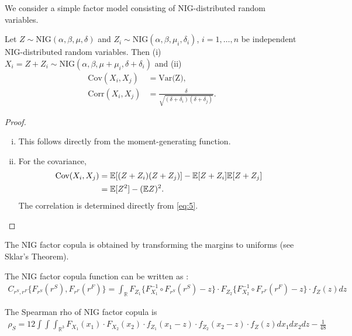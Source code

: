 We consider a simple factor model consisting of NIG-distributed random
variables.
\begin{proposition}
  \label{prop:NIG}
  Let $Z\sim \text{NIG}(\alpha, \beta, \mu, \delta)$ and
  $Z_i\sim \text{NIG}(\alpha, \beta, \mu_i, \delta_i)$,
  $i=1,\ldots, n$ be independent NIG-distributed random
  variables. Then (i) 
  $X_i = Z + Z_i\sim \text{NIG}(\alpha,\beta,\mu+\mu_i,
  \delta+\delta_i)$ and (ii)
  \begin{align}
    \text{Cov}(X_i,X_j) &= \text{Var(Z)},\nonumber\\
    \text{Corr}(X_i,X_j) &= \frac{\delta}{\sqrt{(\delta+\delta_i)
                           (\delta+\delta_j)}}. \label{eq:6}
  \end{align}
\end{proposition}
\begin{proof}
  \begin{enumerate}[(i)]
  \item This follows directly from the moment-generating function. 
  \item For the covariance,
    \begin{align*}
      \text{Cov}(X_i,X_j)
      &= {\mathbb{E}}[(Z+Z_i) (Z+Z_j)] - {\mathbb{E}}[Z+Z_i] {\mathbb{E}}[Z+Z_j]\\
      &= {\mathbb{E}}[Z^2] -({\mathbb{E}} Z)^2.
    \end{align*}
    The correlation is determined directly from \eqref{eq:5}. 
  \end{enumerate}
\end{proof}

The NIG factor copula is obtained by transforming the margins to
uniforms (see Sklar's Theorem).

The NIG factor copula function can be written as \citep{krupskii2013factor}:
\begin{align}
  C_{r^S, r^F}\{F_{r^S}(r^S), F_{r^F}(r^F)\} = \int_\mathbb{R}
  F_{Z_1}\{F_{X_1}^{-1} \circ F_{r^S}(r^S) -z\} \cdot
  F_{Z_2}\{F_{X_2}^{-1} \circ F_{r^F}(r^F) -z\} \cdot
  f_Z(z) dz
  \end{align}

The Spearman rho of NIG factor copula is
\begin{align}
  \rho_S = 12 \int \int \int_{\mathbb{R}^3}
  F_{X_1}(x_1) \cdot
  F_{X_2}(x_2) \cdot
  f_{Z_1}(x_1-z) \cdot
  f_{Z_2}(x_2-z) \cdot
  f_Z(z) dx_1 dx_2 dz - \frac{1}{48}
  \end{align}

